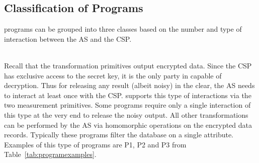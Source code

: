 
\subsection{Classification of \system Programs}
\system programs can be grouped into three classes based on the number and type of interaction between the \textsf{AS} and the \textsf{CSP}. 

\\
Recall that the transformation primitives output encrypted data.  Since  the \textsf{CSP} has exclusive access to the secret key, it is the only party in \system capable of decryption. Thus for releasing any result (albeit noisy) in the clear, the \textsf{AS} needs to interact at least once with the \textsf{CSP}. \system supports this type of interactions via the two measurement primitives. Some \system programs require only a single interaction of this type at the very end to release the noisy output. All other transformations can be performed by the \textsf{AS} via homomorphic operations on the encrypted data records. Typically these programs filter the database on a single attribute. Examples of this type of programs are P1, P2 and P3 from Table~\ref{tab:programexamples}.

